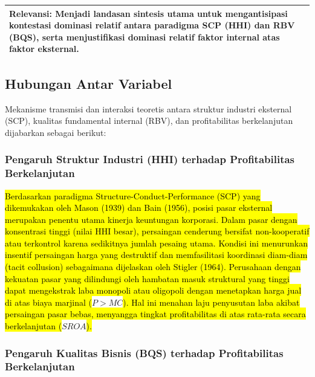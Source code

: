 \documentclass[12pt,a4paper]{article}
\begin{document}
\begin{longtable}{>{\raggedright\arraybackslash}p{} >{\raggedright\arraybackslash}p{}}
\textbf{Relevansi:} Menjadi landasan sintesis utama untuk mengantisipasi kontestasi dominasi relatif antara paradigma SCP (HHI) dan RBV (BQS), serta menjustifikasi dominasi relatif faktor internal atas faktor eksternal. \\
\bottomrule
\end{longtable}

\subsection{Hubungan Antar Variabel}\label{hubungan-antar-variabel}

Mekanisme transmisi dan interaksi teoretis antara struktur industri
eksternal (SCP), kualitas fundamental internal (RBV), dan profitabilitas
berkelanjutan dijabarkan sebagai berikut:

\subsubsection{Pengaruh Struktur Industri (HHI) terhadap Profitabilitas
Berkelanjutan}\label{pengaruh-struktur-industri-hhi-terhadap-profitabilitas-berkelanjutan}

\hl{Berdasarkan paradigma Structure-Conduct-Performance (SCP) yang dikemukakan oleh Mason (1939) dan Bain (1956), posisi pasar eksternal merupakan penentu utama kinerja keuntungan korporasi. Dalam pasar dengan konsentrasi tinggi (nilai HHI besar), persaingan cenderung bersifat non-kooperatif atau terkontrol karena sedikitnya jumlah pesaing utama. Kondisi ini menurunkan insentif persaingan harga yang destruktif dan memfasilitasi koordinasi diam-diam (tacit collusion) sebagaimana dijelaskan oleh Stigler (1964). Perusahaan dengan kekuatan pasar yang dilindungi oleh hambatan masuk struktural yang tinggi dapat mengekstrak laba monopoli atau oligopoli dengan menetapkan harga jual di atas biaya marjinal (}$P > MC$\hl{). Hal ini menahan laju penyusutan laba akibat persaingan pasar bebas, menyangga tingkat profitabilitas di atas rata-rata secara berkelanjutan (}$SROA$\hl{).}

\subsubsection{Pengaruh Kualitas Bisnis (BQS) terhadap Profitabilitas
Berkelanjutan}\label{pengaruh-kualitas-bisnis-bqs-terhadap-profitabilitas-berkelanjutan}
\end{document}
